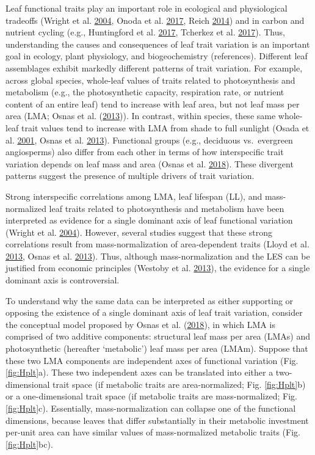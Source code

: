 \documentclass[
  12pt,
]{article}
\begin{document}
Leaf functional traits play an important role in ecological and physiological tradeoffs (Wright et al. \protect\hyperlink{ref-Wright2004a}{2004}, Onoda et al. \protect\hyperlink{ref-Onoda2017}{2017}, Reich \protect\hyperlink{ref-Reich2014}{2014}) and in carbon and nutrient cycling (e.g., Huntingford et al. \protect\hyperlink{ref-Huntingford2017}{2017}, Tcherkez et al. \protect\hyperlink{ref-Tcherkez2017}{2017}).
Thus, understanding the causes and consequences of leaf trait variation is an important goal in ecology, plant physiology, and biogeochemistry (references).
Different leaf assemblages exhibit markedly different patterns of trait variation.
For example, across global species, whole-leaf values of traits related to photosynthesis and metabolism (e.g., the photosynthetic capacity, respiration rate, or nutrient content of an entire leaf) tend to increase with leaf area, but not leaf mass per area (LMA; Osnas et al. (\protect\hyperlink{ref-Osnas2013}{2013})). In contrast, within species, these same whole-leaf trait values tend to increase with LMA from shade to full sunlight (Osada et al. \protect\hyperlink{ref-Osada2001}{2001}, Osnas et al. \protect\hyperlink{ref-Osnas2013}{2013}).
Functional groups (e.g., deciduous vs.~evergreen angiosperms) also differ from each other in terms of how interspecific trait variation depends on leaf mass and area (Osnas et al. \protect\hyperlink{ref-Osnas2018}{2018}).
These divergent patterns suggest the presence of multiple drivers of trait variation.

Strong interspecific correlations among LMA, leaf lifespan (LL), and mass-normalized leaf traits related to photosynthesis and metabolism have been interpreted as evidence for a single dominant axis of leaf functional variation (Wright et al. \protect\hyperlink{ref-Wright2004a}{2004}).
However, several studies suggest that these strong correlations result from mass-normalization of area-dependent traits (Lloyd et al. \protect\hyperlink{ref-Lloyd2013}{2013}, Osnas et al. \protect\hyperlink{ref-Osnas2013}{2013}).
Thus, although mass-normalization and the LES can be justified from economic principles (Westoby et al. \protect\hyperlink{ref-Westoby2013}{2013}), the evidence for a single dominant axis is controversial.

To understand why the same data can be interpreted as either supporting or opposing the existence of a single dominant axis of leaf trait variation, consider the conceptual model proposed by Osnas et al. (\protect\hyperlink{ref-Osnas2018}{2018}), in which LMA is comprised of two additive components: structural leaf mass per area (LMAs) and photosynthetic (hereafter `metabolic') leaf mass per area (LMAm).
Suppose that these two LMA components are independent axes of functional variation (Fig. \ref{fig:Hplt}a).
These two independent axes can be translated into either a two-dimensional trait space (if metabolic traits are area-normalized; Fig. \ref{fig:Hplt}b) or a one-dimensional trait space (if metabolic traits are mass-normalized; Fig. \ref{fig:Hplt}c).
Essentially, mass-normalization can collapse one of the functional dimensions, because leaves that differ substantially in their metabolic investment per-unit area can have similar values of mass-normalized metabolic traits (Fig. \ref{fig:Hplt}bc).
\end{document}
